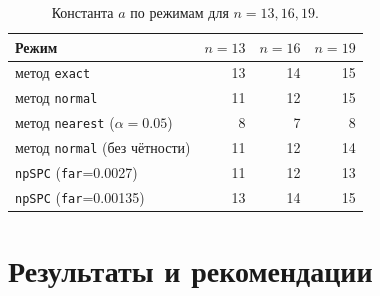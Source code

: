 \documentclass[11pt,a4paper]{article}
\begin{document}
\begin{table}[htbp]\centering
\caption{Константа $a$ по режимам для $n=13,16,19$.}
\label{tab:modes-alln}
\small
\begin{tabular}{@{}l r r r@{}}
\toprule
Режим & $n=13$ & $n=16$ & $n=19$ \\
\midrule
метод \texttt{exact}                        & 13 & 14 & 15 \\
метод \texttt{normal}                       & 11 & 12 & 15 \\
метод \texttt{nearest} ($\alpha=0.05$)      &  8 &  7 &  8 \\
метод \texttt{normal} (без чётности)        & 11 & 12 & 14 \\
\texttt{npSPC} (\texttt{far}=0.0027)        & 11 & 12 & 13 \\
\texttt{npSPC} (\texttt{far}=0.00135)       & 13 & 14 & 15 \\
\bottomrule
\end{tabular}
\end{table}


\section{Результаты и рекомендации}
\end{document}

